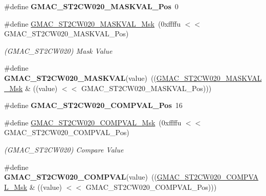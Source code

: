 \begin{DoxyCompactItemize}
\#define {\bfseries G\+M\+A\+C\+\_\+\+S\+T2\+C\+W020\+\_\+\+M\+A\+S\+K\+V\+A\+L\+\_\+\+Pos}~0
\item 
\mbox{\label{group__SAME70__GMAC_ga25062cff7c8b57141ceda474a779c4c8}} 
\#define \mbox{\hyperlink{group__SAME70__GMAC_ga25062cff7c8b57141ceda474a779c4c8}{G\+M\+A\+C\+\_\+\+S\+T2\+C\+W020\+\_\+\+M\+A\+S\+K\+V\+A\+L\+\_\+\+Msk}}~(0xffffu $<$$<$ G\+M\+A\+C\+\_\+\+S\+T2\+C\+W020\+\_\+\+M\+A\+S\+K\+V\+A\+L\+\_\+\+Pos)
\begin{DoxyCompactList}\small\item\em (G\+M\+A\+C\+\_\+\+S\+T2\+C\+W020) Mask Value \end{DoxyCompactList}\item 
\mbox{\label{group__SAME70__GMAC_gaa021d1387672f9c05df195043629213d}} 
\#define {\bfseries G\+M\+A\+C\+\_\+\+S\+T2\+C\+W020\+\_\+\+M\+A\+S\+K\+V\+AL}(value)~((\mbox{\hyperlink{group__SAMV71__GMAC_ga25062cff7c8b57141ceda474a779c4c8}{G\+M\+A\+C\+\_\+\+S\+T2\+C\+W020\+\_\+\+M\+A\+S\+K\+V\+A\+L\+\_\+\+Msk}} \& ((value) $<$$<$ G\+M\+A\+C\+\_\+\+S\+T2\+C\+W020\+\_\+\+M\+A\+S\+K\+V\+A\+L\+\_\+\+Pos)))
\item 
\mbox{\label{group__SAME70__GMAC_ga77fe4cefac592c747257bab5df887726}} 
\#define {\bfseries G\+M\+A\+C\+\_\+\+S\+T2\+C\+W020\+\_\+\+C\+O\+M\+P\+V\+A\+L\+\_\+\+Pos}~16
\item 
\mbox{\label{group__SAME70__GMAC_gadb8b92108eead0ab8244f1a98f642ecd}} 
\#define \mbox{\hyperlink{group__SAME70__GMAC_gadb8b92108eead0ab8244f1a98f642ecd}{G\+M\+A\+C\+\_\+\+S\+T2\+C\+W020\+\_\+\+C\+O\+M\+P\+V\+A\+L\+\_\+\+Msk}}~(0xffffu $<$$<$ G\+M\+A\+C\+\_\+\+S\+T2\+C\+W020\+\_\+\+C\+O\+M\+P\+V\+A\+L\+\_\+\+Pos)
\begin{DoxyCompactList}\small\item\em (G\+M\+A\+C\+\_\+\+S\+T2\+C\+W020) Compare Value \end{DoxyCompactList}\item 
\mbox{\label{group__SAME70__GMAC_ga77d06d2c8f68fa0282b5a0cc0519d4b9}} 
\#define {\bfseries G\+M\+A\+C\+\_\+\+S\+T2\+C\+W020\+\_\+\+C\+O\+M\+P\+V\+AL}(value)~((\mbox{\hyperlink{group__SAMV71__GMAC_gadb8b92108eead0ab8244f1a98f642ecd}{G\+M\+A\+C\+\_\+\+S\+T2\+C\+W020\+\_\+\+C\+O\+M\+P\+V\+A\+L\+\_\+\+Msk}} \& ((value) $<$$<$ G\+M\+A\+C\+\_\+\+S\+T2\+C\+W020\+\_\+\+C\+O\+M\+P\+V\+A\+L\+\_\+\+Pos)))

\end{DoxyCompactItemize}
